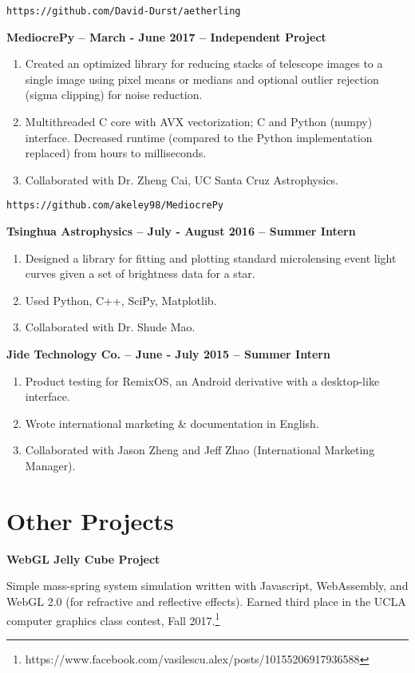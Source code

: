 \documentclass[11pt]{article}
\begin{document}
\quad\texttt{https://github.com/David-Durst/aetherling}

\textbf{MediocrePy -- March - June 2017 -- Independent Project}
\begin{enumerate}
\item Created an optimized library for reducing stacks of telescope
  images to a single image using pixel means or medians and optional
  outlier rejection (sigma clipping) for noise reduction.
\item Multithreaded C core with AVX vectorization; C and Python
  (numpy) interface. Decreased runtime (compared to the Python
  implementation replaced) from hours to milliseconds.
\item Collaborated with Dr. Zheng Cai, UC Santa Cruz Astrophysics.
\end{enumerate}
\quad\texttt{https://github.com/akeley98/MediocrePy}

\textbf{Tsinghua Astrophysics -- July - August 2016 -- Summer Intern}
\begin{enumerate}
\item Designed a library for fitting and plotting standard
  microlensing event light curves given a set of brightness
  data for a star.
\item Used Python, C++, SciPy, Matplotlib.
\item Collaborated with Dr. Shude Mao.
\end{enumerate}

\textbf{Jide Technology Co. -- June - July 2015 -- Summer Intern}
\begin{enumerate}
\item Product testing for RemixOS, an Android derivative with a
  desktop-like interface.

\item Wrote international marketing \& documentation in English.

\item Collaborated with Jason Zheng and Jeff Zhao (International
  Marketing Manager).
\end{enumerate}

\section{Other Projects}

\textbf{WebGL Jelly Cube Project}

Simple mass-spring system simulation written with Javascript,
WebAssembly, and WebGL 2.0 (for refractive and reflective effects).
Earned third place in the UCLA computer graphics class contest, Fall
2017.\footnote{
  https://www.facebook.com/vasilescu.alex/posts/10155206917936588}
\end{document}
